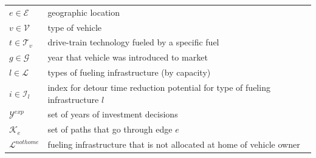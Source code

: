 \documentclass[preprint,review,11pt, authoryear]{elsarticle}
\begin{document}
\begin{scriptsize}
\begin{longtable}{llll}
$e \in \mathcal{E}$                      & geographic location                                                  &         &               \\
$v \in \mathcal{V}$                      & type of vehicle                                                      &         &               \\
$t \in \mathcal{T}_v$                      & drive-train technology fueled by a specific fuel                     &         &               \\
$g \in \mathcal{G}$                      & year that vehicle was introduced to market                           &         &               \\
$l \in \mathcal{L}$                      & types of fueling infrastructure (by capacity) &         &               \\
$i \in \mathcal{I}_l$ &  \multicolumn{3}{l}{index for detour time reduction potential for type of fueling infrastructure $l$ }\\
$\mathcal{Y}^{exp}$                      & set of years of investment decisions                                 &         &               \\
$\mathcal{K}_{e}$                      &   set of paths that go through edge $e$                               &         &               \\
$\mathcal{L}^{not home}$ &
  \multicolumn{3}{l}{fueling infrastructure that is not allocated at home of vehicle owner} 
   \\
   

\end{longtable}
\end{scriptsize}
\end{document}
